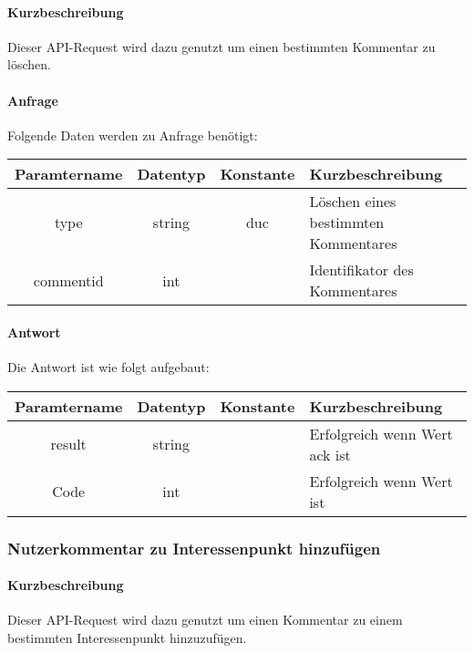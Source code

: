 \paragraph{Kurzbeschreibung}Dieser API-Request wird dazu genutzt um einen bestimmten Kommentar zu löschen.
\paragraph{Anfrage}Folgende Daten werden zu Anfrage benötigt:
\begin{table}[H]
	\begin{tabular}{|c|c|c|p{6.5cm}|}
		\hline
		\textbf{Paramtername} & \textbf{Datentyp} & \textbf{Konstante} & \textbf{Kurzbeschreibung}                                                                                               \\ \hline
		type                & string            & duc                & Löschen eines bestimmten Kommentares \\ \hline
		commentid           & int               &                    & Identifikator des Kommentares \\ \hline
	\end{tabular}
\end{table}
\paragraph{Antwort}Die Antwort ist wie folgt aufgebaut:
\begin{table}[H]
	\begin{tabular}{|c|c|c|p{6.5cm}|}
		\hline
		\textbf{Paramtername} & \textbf{Datentyp} & \textbf{Konstante} & \textbf{Kurzbeschreibung}                                                                                               \\ \hline
		result              & string           &                 & Erfolgreich wenn Wert {\glqq ack\grqq} ist \\ \hline
		Code                & int              &                 & Erfolgreich wenn Wert {\glqq 0\grqq} ist \\ \hline
	\end{tabular}
\end{table}
\subsubsection{Nutzerkommentar zu Interessenpunkt hinzufügen}
\paragraph{Kurzbeschreibung}Dieser API-Request wird dazu genutzt um einen Kommentar zu einem bestimmten Interessenpunkt hinzuzufügen.
